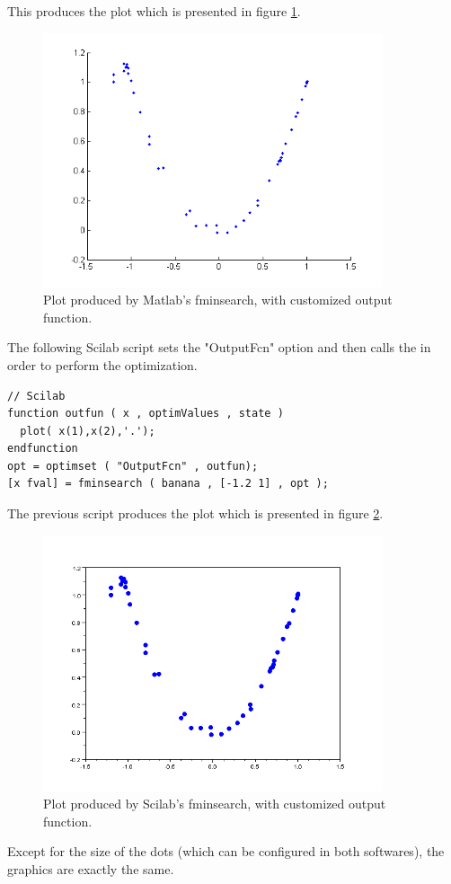 This produces the plot which is presented in figure \ref{fig-fminsearch-matlab-outputfun}.

\begin{figure}
\begin{center}
\includegraphics[width=10cm]{testFminsearchPlotMatlab.png}
\end{center}
\caption{Plot produced by Matlab's fminsearch, with customized output function.}
\label{fig-fminsearch-matlab-outputfun}
\end{figure}

The following Scilab script sets the "OutputFcn" option and then calls 
the  in order to perform the optimization.

\lstset{language=scilabscript}
\begin{lstlisting}
// Scilab
function outfun ( x , optimValues , state )
  plot( x(1),x(2),'.');
endfunction
opt = optimset ( "OutputFcn" , outfun);
[x fval] = fminsearch ( banana , [-1.2 1] , opt );
\end{lstlisting}

The previous script produces the plot which is presented 
in figure \ref{fig-fminsearch-scilab-outputfun}.

\begin{figure}
\begin{center}
\includegraphics[width=10cm]{testFminsearchPlotScilab.png}
\end{center}
\caption{Plot produced by Scilab's fminsearch, with customized output function.}
\label{fig-fminsearch-scilab-outputfun}
\end{figure}

Except for the size of the dots (which can be configured in 
both softwares), the graphics are exactly the same.


